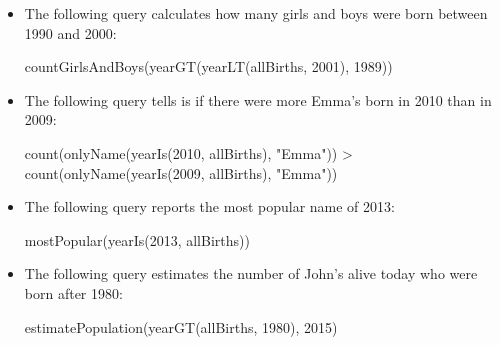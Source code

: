 \begin{itemize}

  \item The following query calculates how many girls and boys were born between 1990
  and 2000:

  \begin{scalacode}
  countGirlsAndBoys(yearGT(yearLT(allBirths, 2001), 1989))
  \end{scalacode}

  \item The following query tells is if there were more Emma's born in 2010 than
  in 2009:

  \begin{scalacode}
  count(onlyName(yearIs(2010, allBirths), "Emma")) > count(onlyName(yearIs(2009, allBirths), "Emma"))
  \end{scalacode}

  \item The following query reports the most popular name of 2013:

  \begin{scalacode}
  mostPopular(yearIs(2013, allBirths))
  \end{scalacode}

  \item The following query estimates the number of John's alive today who
  were born after 1980:

  \begin{scalacode}
  estimatePopulation(yearGT(allBirths, 1980), 2015)
  \end{scalacode}

\end{itemize}


